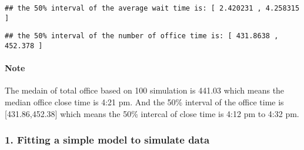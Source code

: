 \documentclass[]{article}
\newenvironment{Shaded}{\begin{snugshade}}{\end{snugshade}}
\newcommand{\KeywordTok}[1]{\textcolor[rgb]{0.13,0.29,0.53}{\textbf{#1}}}
\newcommand{\DataTypeTok}[1]{\textcolor[rgb]{0.13,0.29,0.53}{#1}}
\newcommand{\FloatTok}[1]{\textcolor[rgb]{0.00,0.00,0.81}{#1}}
\newcommand{\CharTok}[1]{\textcolor[rgb]{0.31,0.60,0.02}{#1}}
\newcommand{\StringTok}[1]{\textcolor[rgb]{0.31,0.60,0.02}{#1}}
\newcommand{\NormalTok}[1]{#1}
\let\oldparagraph\paragraph
\renewcommand{\paragraph}[1]{\oldparagraph{#1}\mbox{}}
\begin{document}
\begin{Shaded}
\end{Shaded}

\begin{verbatim}
## the 50% interval of the average wait time is: [ 2.420231 , 4.258315 ]
\end{verbatim}

\begin{Shaded}
\end{Shaded}

\begin{verbatim}
## the 50% interval of the number of office time is: [ 431.8638 , 452.378 ]
\end{verbatim}

\paragraph{Note}\label{note-1}

The medain of total office based on 100 simulation is 441.03 which means
the median office close time is 4:21 pm. And the 50\% interval of the
office time is {[}431.86,452.38{]} which means the 50\% intercal of
close time is 4:12 pm to 4:32 pm.

\subsubsection{1. Fitting a simple model to simulate
data}\label{fitting-a-simple-model-to-simulate-data}
\end{document}
